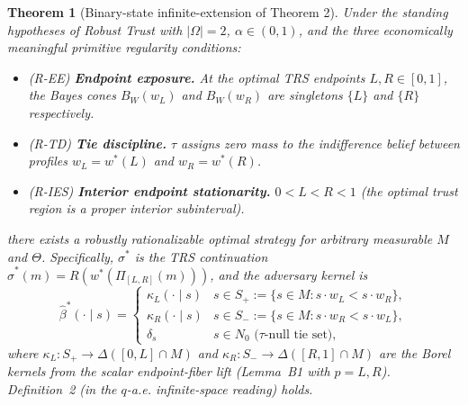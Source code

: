 \documentclass[11pt]{article}
\newtheorem{theorem}{Theorem}
\theoremstyle{definition}
\theoremstyle{remark}
\begin{document}
\begin{theorem}[Binary-state infinite-extension of Theorem 2]\label{thm:binary}
Under the standing hypotheses of \emph{Robust Trust} with $|\Omega| = 2$,
$\alpha\in(0,1)$, and the three economically meaningful primitive
regularity conditions:
\begin{itemize}
  \item (R-EE) \textbf{Endpoint exposure.} At the optimal TRS endpoints
    $L, R\in[0,1]$, the Bayes cones $B_W(w_L)$ and $B_W(w_R)$ are
    singletons $\{L\}$ and $\{R\}$ respectively.
  \item (R-TD) \textbf{Tie discipline.} $\tau$ assigns zero mass to the
    indifference belief between profiles $w_L = w^*(L)$ and $w_R = w^*(R)$.
  \item (R-IES) \textbf{Interior endpoint stationarity.} $0 < L < R < 1$
    (the optimal trust region is a proper interior subinterval).
\end{itemize}
there exists a robustly rationalizable optimal strategy for
\emph{arbitrary measurable $M$ and $\Theta$}. Specifically, $\sigma^*$
is the TRS continuation $\hat\sigma^*(m) = R(w^*(\Pi_{[L,R]}(m)))$, and
the adversary kernel is
\[
  \hat\beta^*(\cdot\mid s) = \begin{cases}
    \kappa_L(\cdot\mid s) & s\in S_+ := \{s\in M : s\!\cdot w_L < s\!\cdot w_R\}, \\
    \kappa_R(\cdot\mid s) & s\in S_- := \{s\in M : s\!\cdot w_R < s\!\cdot w_L\}, \\
    \delta_s & s \in N_0 \text{ ($\tau$-null tie set)},
  \end{cases}
\]
where $\kappa_L: S_+\to\Delta([0,L]\cap M)$ and $\kappa_R: S_-\to\Delta([R,1]\cap M)$
are the Borel kernels from the scalar endpoint-fiber lift
(Lemma~B1 with $p=L,R$). Definition~2 (in the $q$-a.e. infinite-space
reading) holds.
\end{theorem}
\end{document}
